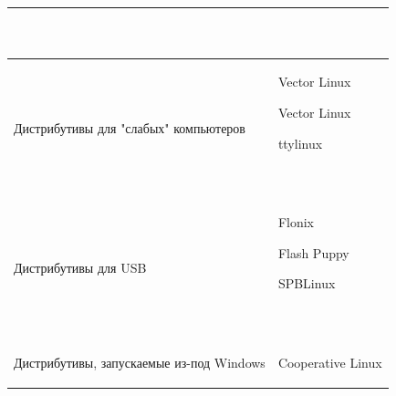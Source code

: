 \documentclass[bachelor, och, referat, times]{SCWorks}
\begin{document}
\begin{longtable}{|p{}|
p{}|}
\begin{minipage}{\textwidth}
\begin{list}{•}{~}
        \end{list}
        ~
    \end{minipage}
    \\\hline
    Дистрибутивы для "слабых" компьютеров &
    \begin{minipage}{\textwidth}
        \begin{list}{•}{~}
            \item Vector Linux
            \item Vector Linux
            \item ttylinux
        \end{list}
        ~
    \end{minipage}
    \\\hline
    Дистрибутивы для USB &
    \begin{minipage}{\textwidth}
        \begin{list}{•}{~}
            \item Flonix
            \item Flash Puppy
            \item SPBLinux
        \end{list}
        ~
    \end{minipage}
    \\\hline
    Дистрибутивы, запускаемые из-под Windows &
    \begin{minipage}{\textwidth}
        \begin{list}{•}{~}
            \item Cooperative Linux
        \end{list}
        
    \end{minipage}
    \hline
\end{longtable}
\end{document}
